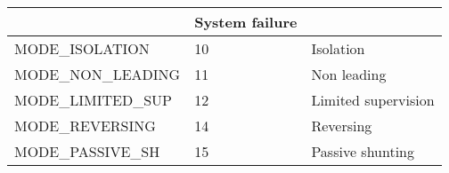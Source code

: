 \documentclass{template/openetcs_article}
\begin{document}
\begin{longtable}{|l|l|l|}
	&	\begin{minipage}[t]{0.45\linewidth} System failure	\end{minipage} \\
	\hline
		\begin{minipage}[t]{0.45\linewidth} MODE\_ISOLATION	\end{minipage}
	&	\begin{minipage}[t]{0.15\linewidth} 10	\end{minipage} 
	&	\begin{minipage}[t]{0.45\linewidth} Isolation	\end{minipage} \\
	\hline
		\begin{minipage}[t]{0.45\linewidth} MODE\_NON\_LEADING	\end{minipage}
	&	\begin{minipage}[t]{0.15\linewidth} 11	\end{minipage} 
	&	\begin{minipage}[t]{0.45\linewidth} Non leading	\end{minipage} \\
	\hline
		\begin{minipage}[t]{0.45\linewidth} MODE\_LIMITED\_SUP	\end{minipage}
	&	\begin{minipage}[t]{0.15\linewidth} 12	\end{minipage} 
	&	\begin{minipage}[t]{0.45\linewidth} Limited supervision	\end{minipage} \\
	\hline
		\begin{minipage}[t]{0.45\linewidth} MODE\_REVERSING	\end{minipage}
	&	\begin{minipage}[t]{0.15\linewidth} 14	\end{minipage} 
	&	\begin{minipage}[t]{0.45\linewidth} Reversing	\end{minipage} \\
	\hline
		\begin{minipage}[t]{0.45\linewidth} MODE\_PASSIVE\_SH	\end{minipage}
	&	\begin{minipage}[t]{0.15\linewidth} 15	\end{minipage} 
	&	\begin{minipage}[t]{0.45\linewidth} Passive shunting	\end{minipage} \\

\end{longtable}
\end{document}

